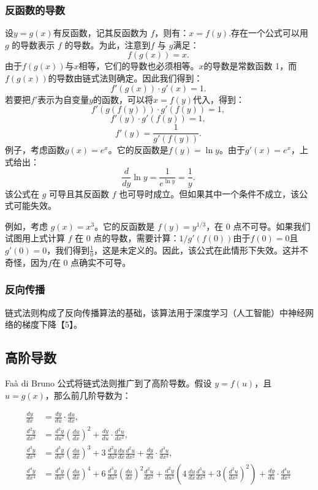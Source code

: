 \subsubsection{反函数的导数}
设$y = g(x)$有反函数，记其反函数为 $f$，则有：$x = f(y)$.存在一个公式可以用 $g$ 的导数表示 $f$ 的导数。为此，注意到$f$ 与 $g$满足：
$$
f(g(x)) = x.~
$$
由于$f(g(x))$与$x$相等，它们的导数也必须相等。$x$的导数是常数函数 1，而 $f(g(x))$的导数由链式法则确定。因此我们得到：
$$
f'(g(x)) \cdot g'(x) = 1.~
$$
若要把$f'$表示为自变量$y$的函数，可以将$x = f(y)$代入，得到：
$$
f'(g(f(y))) \cdot g'(f(y)) = 1,~
$$
$$
f'(y) \cdot g'(f(y)) = 1,~
$$
$$
f'(y) = \frac{1}{g'(f(y))}.~
$$
例子，考虑函数$g(x) = e^x$。它的反函数是$f(y) = \ln y$。由于$g'(x) = e^x$，上式给出：
$$
\frac{d}{dy}\ln y = \frac{1}{e^{\ln y}} = \frac{1}{y}.~
$$
该公式在 $g$ 可导且其反函数 $f$ 也可导时成立。但如果其中一个条件不成立，该公式可能失效。

例如，考虑 $g(x) = x^3$。它的反函数是 $f(y) = y^{1/3}$，在 0 点不可导。如果我们试图用上式计算 $f$ 在 0 点的导数，需要计算：$1/g'(f(0))$由于$f(0) = 0$且$g'(0) = 0$，我们得到$\tfrac{1}{0}$，这是未定义的。因此，该公式在此情形下失效。这并不奇怪，因为$f$在 0 点确实不可导。
\subsubsection{反向传播}
链式法则构成了反向传播算法的基础，该算法用于深度学习（人工智能）中神经网络的梯度下降【5】。
\subsection{高阶导数}
Faà di Bruno 公式将链式法则推广到了高阶导数。假设 $y = f(u)$，且 $u = g(x)$，那么前几阶导数为：

$$
\begin{aligned}
\frac{dy}{dx} &= \frac{dy}{du} \cdot \frac{du}{dx},\\
\frac{d^2y}{dx^2} &= \frac{d^2y}{du^2}\left(\frac{du}{dx}\right)^2 + \frac{dy}{du}\cdot \frac{d^2u}{dx^2},\\
\frac{d^3y}{dx^3} &= \frac{d^3y}{du^3}\left(\frac{du}{dx}\right)^3 + 3\,\frac{d^2y}{du^2}\frac{du}{dx}\frac{d^2u}{dx^2} + \frac{dy}{du}\cdot \frac{d^3u}{dx^3},\\
\frac{d^4y}{dx^4} &= \frac{d^4y}{du^4}\left(\frac{du}{dx}\right)^4 + 6\,\frac{d^3y}{du^3}\left(\frac{du}{dx}\right)^2 \frac{d^2u}{dx^2} 
+ \frac{d^2y}{du^2}\left(4\,\frac{du}{dx}\frac{d^3u}{dx^3} + 3\left(\frac{d^2u}{dx^2}\right)^2\right) 
+ \frac{dy}{du}\cdot \frac{d^4u}{dx^4}
\end{aligned}~
$$
